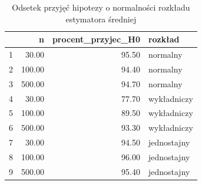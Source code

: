 \documentclass[10pt, a4paper]{article}\usepackage[]{graphicx}\usepackage[]{xcolor}
\begin{document}
\begin{table}[ht]
\centering
\caption{Odsetek przyjęć hipotezy o normalności rozkładu estymatora średniej} 
\label{tab:srednia_normalnosc}
\begin{tabular}{rrrl}
  \hline
 & n & procent\_przyjec\_H0 & rozkład \\ 
  \hline
1 & 30.00 & 95.50 & normalny \\ 
  2 & 100.00 & 94.40 & normalny \\ 
  3 & 500.00 & 94.70 & normalny \\ 
  4 & 30.00 & 77.70 & wykładniczy \\ 
  5 & 100.00 & 89.50 & wykładniczy \\ 
  6 & 500.00 & 93.30 & wykładniczy \\ 
  7 & 30.00 & 94.50 & jednostajny \\ 
  8 & 100.00 & 96.00 & jednostajny \\ 
  9 & 500.00 & 95.40 & jednostajny \\ 
   \hline
\end{tabular}
\end{table}
\end{document}
